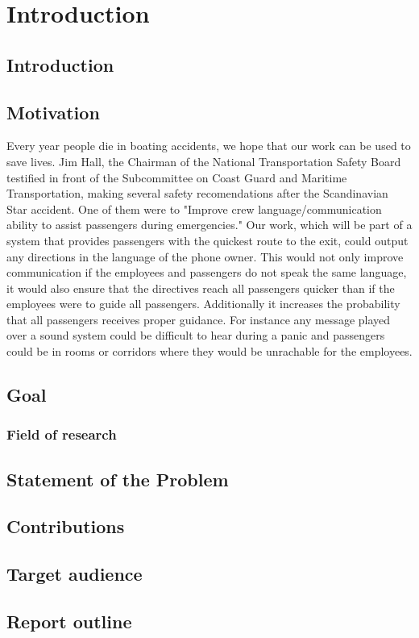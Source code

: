 \chapter{Introduction}
\label{ch:introduction}

\section{Introduction}



\section{Motivation}

Every year people die in boating accidents, we hope that our work can be
used to save lives. Jim Hall, the Chairman of the National Transportation 
Safety Board testified in front of the Subcommittee on Coast Guard and Maritime 
Transportation, making several safety recomendations after the Scandinavian Star
accident. One of them were to "Improve crew language/communication 
ability to assist passengers during emergencies." Our work, which will be part of a system
that provides passengers with the quickest route to the exit, could output 
any directions in the language of the phone owner. This would not only improve 
communication if the employees and passengers do not speak the same language, 
it would also ensure that the directives reach all passengers quicker than if the employees 
were to guide all passengers. Additionally it increases the probability that all passengers 
receives proper guidance. For instance any message played over a sound system could be
difficult to hear during a panic and passengers could be in rooms or corridors
where they would be unrachable for the employees.

\section{Goal}

\subsection{Field of research}

\section{Statement of the Problem}

\section{Contributions}
 
\section{Target audience}

\section{Report outline}

